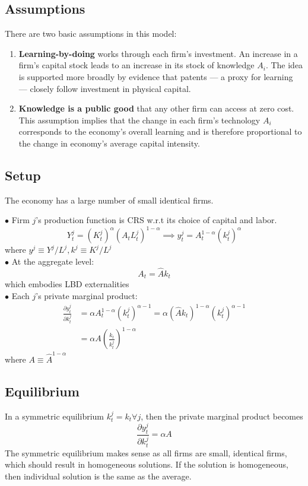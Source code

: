 \documentclass[twocolumn, fleqn]{article}
\begin{document}
		\subsection{Assumptions}\label{subsec:assumptions}
			There are two basic assumptions in this model:
			\begin{enumerate}
				\item \textbf{Learning-by-doing} works through each firm's investment. An increase in a firm's
				capital stock leads to an increase in its stock of knowledge $A_i$. The idea is supported more
				broadly by evidence that patents --- a proxy for learning --- closely follow investment in physical
				capital.
				\item \textbf{Knowledge is a public good} that any other firm can access at zero cost. This assumption
				implies that the change in each firm's technology $A_i$ corresponds to the economy's overall
				learning and is therefore proportional to the change in economy's average capital intensity.
			\end{enumerate}

		\subsection{Setup}\label{subsec:setup}
			The economy has a large number of small identical firms.

			$\bullet$ Firm $j$'s production function is CRS w.r.t its choice of capital and labor.
			\[Y_t^j = (K_t^{j})^\alpha (A_t L_t^j)^{1-\alpha} \implies y_t^j = A_t^{1-\alpha}(k_t^j)^\alpha\]
			where $y^j \equiv Y^j / L^j, k^j \equiv K^j / L^j$\\

			$\bullet$ At the aggregate level:
			\[A_t = \hat{A} k_t\]
			which embodies LBD externalities\\

			$\bullet$ Each $j$'s private marginal product:
			\begin{align*}
				\frac{\partial y_t^j}{\partial k_t^j}&=\alpha A_t^{1-\alpha} (k_t^j)^{\alpha-1}
				= \alpha (\hat{A} k_t)^{1-\alpha} (k_t^j)^{\alpha-1}\\
				&=\alpha A\left(\frac{k_t}{k_t^j}
				\right)^{1-\alpha}
			\end{align*}
			where $A \equiv \hat{A}^{1-\alpha}$\\

		\subsection{Equilibrium}\label{subsec:equilibrium}
			In a symmetric equilibrium $k_t^j = k_t \forall j$, then the private marginal product becomes
			\[\frac{\partial y_t^j}{\partial k_t^j}=\alpha A\]
			The symmetric equilibrium makes sense as all firms are small, identical firms, which should result in
			homogeneous solutions.
			If the solution is homogeneous, then individual solution is the same as the average.
\end{document}
